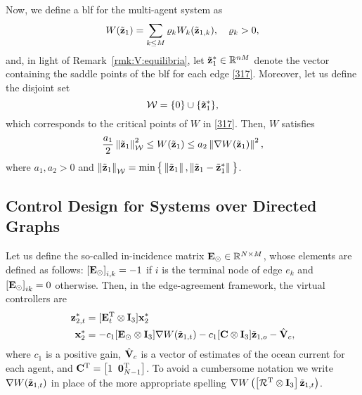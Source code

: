 Now, we define a \gls{blf} for the multi-agent system as
\begin{equation}\label{512}
W(\tilde{\mathbf{z}}_{1})=\sum_{k\leq M} \varrho_k W_k(\tilde{\mathbf{z}}_{1, k}), \quad \varrho_k>0,
\end{equation}
and, in light of Remark~\ref{rmk:V:equilibria}, let $\tilde{\mathbf{z}}_1^*\in\mathbb{R}^{nM}$ denote the vector containing the saddle points of the \gls{blf} for each edge \eqref{317}.
Moreover, let us define the disjoint set
\begin{equation}\label{517}
\mathcal{W}=\{0\}\cup\{\tilde{\mathbf{z}}_1^*\},
\end{equation}
which corresponds to the critical points of $W$ in \eqref{317}.
Then, $W$ satisfies
\begin{equation}\label{eq:BLF-bounds}
\frac{a_1}{2}\left\|\tilde{\mathbf{z}}_{1}\right\|_{\mathcal{W}}^2 \leq W(\tilde{\mathbf{z}}_{1}) \leq a_2\left\|\nabla W(\tilde{\mathbf{z}}_{1})\right\|^2,
\end{equation}
where $a_{1}, a_2 > 0$ and $\left\|\tilde{\mathbf{z}}_{1}\right\|_{\mathcal{W}} = \min \big\{\left\|\tilde{\mathbf{z}}_{1}\right\|, \left\|\tilde{\mathbf{z}}_{1} - \tilde{\mathbf{z}}_{1}^*\right\|\big\}$.

\subsection{Control Design for Systems over Directed Graphs}

Let us define the so-called in-incidence matrix $\mathbf{E}_\odot \in \mathbb{R}^{N\times M}$, whose elements are defined as follows: $\left[\mathbf{E}_\odot\right]_{i, k} = -1$ if $i$ is the terminal node of edge $e_k$ and $\left[\mathbf{E}_\odot\right]_{ik} = 0$ otherwise. Then, in the edge-agreement framework, the virtual controllers are
\begin{equation}\label{n284}\begin{aligned}[b]
\mathbf{z}_{2, t}^*&=[\mathbf{E}_t^{\mathrm{T}} \otimes \mathbf{I}_3] \mathbf{x}_2^*\\
\mathbf{x}_2^*&=-c_1[\mathbf{E}_\odot\otimes \mathbf{I}_3] \nabla W(\tilde{\mathbf{z}}_{1, t})-c_1[\mathbf{C}\otimes \mathbf{I}_3]\tilde{\mathbf{z}}_{1, o} - \hat{\mathbf{V}}_c,
\end{aligned}\end{equation}
where $c_1$ is a positive gain, $\hat{\mathbf{V}}_c$ is a vector of estimates of the ocean current for each agent, and $\mathbf{C}^{\mathrm{T}}=\left[1\;\;\mathbf{0}_{N-1}^{\mathrm{T}}\right]$.
To avoid a cumbersome notation we write $\nabla W(\tilde{\mathbf{z}}_{1, t})$ in place of the more appropriate spelling $\nabla W\left(\left[\mathcal{R}^{\mathrm{T}}\otimes \mathbf{I}_3\right]\tilde{\mathbf{z}}_{1, t}\right)$.

